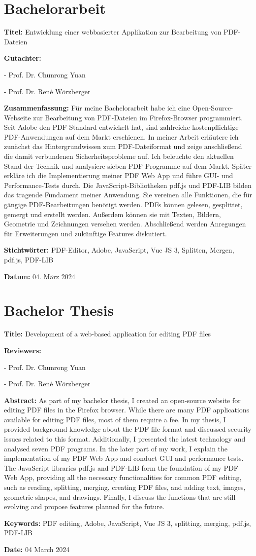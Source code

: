 \chapter*{Bachelorarbeit}
\label{chap:zusammenfassung}
%
\textbf{Titel:} Entwicklung einer webbasierter Applikation zur Bearbeitung von PDF-Dateien

\textbf{Gutachter:}
\par
- Prof. Dr. Chunrong Yuan
\par
- Prof. Dr. René Wörzberger

\textbf{Zusammenfassung:} Für meine Bachelorarbeit habe ich eine Open-Source-Webseite zur Bearbeitung von PDF-Dateien im Firefox-Browser programmiert. Seit Adobe den PDF-Standard entwickelt hat, sind zahlreiche kostenpflichtige PDF-Anwendungen auf dem Markt erschienen. In meiner Arbeit erläutere ich zunächst das Hintergrundwissen zum PDF-Dateiformat und zeige anschließend die damit verbundenen Sicherheitsprobleme auf. Ich beleuchte den aktuellen Stand der Technik und analysiere sieben PDF-Programme auf dem Markt. Später erkläre ich die Implementierung meiner PDF Web App und führe GUI- und Performance-Tests durch. Die JavaScript-Bibliotheken pdf.js und PDF-LIB bilden das tragende Fundament meiner Anwendung. Sie vereinen alle Funktionen, die für gängige PDF-Bearbeitungen benötigt werden. PDFs können gelesen, gesplittet, gemergt und erstellt werden. Außerdem können sie mit Texten, Bildern, Geometrie und Zeichnungen versehen werden. Abschließend werden Anregungen für Erweiterungen und zukünftige Features diskutiert.

\textbf{Stichtwörter:} PDF-Editor, Adobe, JavaScript, Vue JS 3, Splitten, Mergen, pdf.js, PDF-LIB

\textbf{Datum:} 04. März 2024


\newpage
\chapter*{Bachelor Thesis}
\label{chap:abstract}
%
\textbf{Title:} Development of a web-based application for editing PDF files

\textbf{Reviewers:}
\par
- Prof. Dr. Chunrong Yuan
\par
- Prof. Dr. René Wörzberger

\textbf{Abstract:} As part of my bachelor thesis, I created an open-source website for editing PDF files in the Firefox browser.  While there are many PDF applications available for editing PDF files, most of them require a fee. In my thesis, I provided background knowledge about the PDF file format and discussed security issues related to this format. Additionally, I presented the latest technology and analysed seven PDF programs. In the later part of my work, I explain the implementation of my PDF Web App and conduct GUI and performance tests. The JavaScript libraries pdf.js and PDF-LIB form the foundation of my PDF Web App, providing all the necessary functionalities for common PDF editing, such as reading, splitting, merging, creating PDF files, and adding text, images, geometric shapes, and drawings. Finally, I discuss the functions that are still evolving and propose features planned for the future.

\textbf{Keywords:} PDF editing, Adobe, JavaScript, Vue JS 3, splitting, merging, pdf.js, PDF-LIB

\textbf{Date:} 04 March 2024